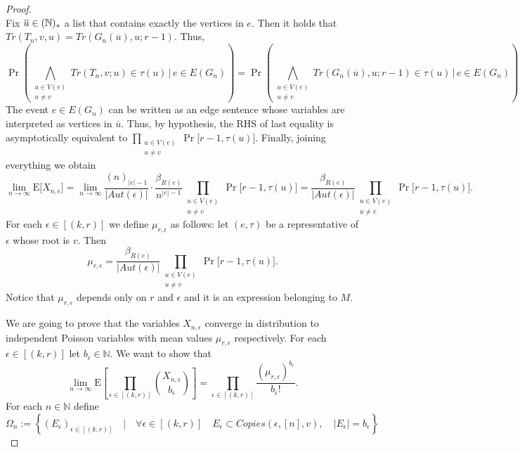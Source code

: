 \documentclass[12pt,notitlepage,a4paper]{article}
\theoremstyle{definition}
\newcommand{\N}{\mathbb{N}}
\newcommand{\Ln}{\lim\limits_{n\to \infty}}
\newcommand{\overbar}[1]{\mkern 1.5mu\overline{\mkern-1.5mu#1\mkern-1.5mu}\mkern 1.5mu}
\begin{document}
\begin{proof}
\[		\]
		Fix $\overbar{u}\in (\N)_*$ a list that contains exactly the vertices
		in $e$. Then it holds that
		$Tr(T_{n}, v, u)=Tr(G_n(\overline{u}),u;r-1)$. 
		Thus,
		\[
		\Pr	\left(
		\bigwedge_{\substack{u\in V(e)\\ u\neq v} } Tr(T_{n}, v; u)\in \tau(u) 
		\, \Bigg| \,  e\in E(G_n) \right)
		=
		\Pr \left(
		\bigwedge_{\substack{u\in V(e)\\ u\neq v} } Tr(G_n(\overline{u}), u;
		r-1)\in \tau(u) \, \Bigg| \,  e\in E(G_n) \right)
		\]		
		The event $e\in E(G_n)$ can be written as an edge sentence
		whose variables are interpreted as vertices in $\overline{u}$.
		Thus, by hypothesis, the RHS of last equality
		is asymptotically equivalent to
		$\prod_{\substack{u\in V(e)\\ u\neq v} } \Pr\big[
		r-1, \tau(u)\big]$.
		Finally, joining everything we obtain
		\[
		\Ln
		\mathrm{E}\big[ X_{n,\epsilon} \big]
		= \Ln \frac{(n)_{|e|-1}}{|Aut(\epsilon)|}
		\cdot  \frac{\beta_{R(e)}}{n^{|e|-1}}
		\prod_{\substack{u\in V(e)\\ u\neq v} }
		\Pr\big[
		r-1, \tau(u)\big] =
		\frac{\beta_{R(e)}}{|Aut(\epsilon)|} 
		\prod_{\substack{u\in V(e)\\ u\neq v} } \Pr\big[
		r-1, \tau(u)\big].
		\]
		For each $\epsilon\in [(k,r)]$ we define $\mu_{r,\epsilon}$ 
		as follows: let $(e,\tau)$ be a representative of $\epsilon$
		whose root is $v$. Then
		\[
		\mu_{r,\epsilon}=\frac{\beta_{R(e)}}{|Aut(\epsilon)|} 
		\prod_{\substack{u\in V(e)\\ u\neq v} } \Pr\big[
		r-1, \tau(u)\big].
		\]
		Notice that $\mu_{r,\epsilon}$ depends only on $r$ and $\epsilon$
		and it is an expression belonging to $M$. \par
		We are going to prove that the variables $X_{n,\epsilon}$
		converge in distribution to independent Poisson variables 
		with mean values $\mu_{r,\epsilon}$ respectively. For
		each $\epsilon\in [(k,r)]$ let $b_\epsilon\in \N$. We want 
		to show that
		\begin{equation} \label{eqn:binomexpedges}
		\Ln
		\mathrm{E}
		\left[
		\prod_{\epsilon\in [(k,r)]} \binom{X_{n,\epsilon}}{b_\epsilon}	
		\right]
		= \prod_{\epsilon\in [(k,r)]} \frac{(\mu_{r,\epsilon})^
		{b_\epsilon}}{b_\epsilon!}.	
		\end{equation}
		For each $n\in \N$ define
		\[
		\Omega_n:=\left\{
		(E_\epsilon)_{\epsilon\in [(k,r)]} \quad 
		\Big | \quad \forall \epsilon\in [(k,r)] \quad
		E_\epsilon\subset Copies(\epsilon,[n],v), 
		\quad |E_\epsilon|=b_\epsilon	
		\right\}		
\]
\end{proof}
\end{document}
